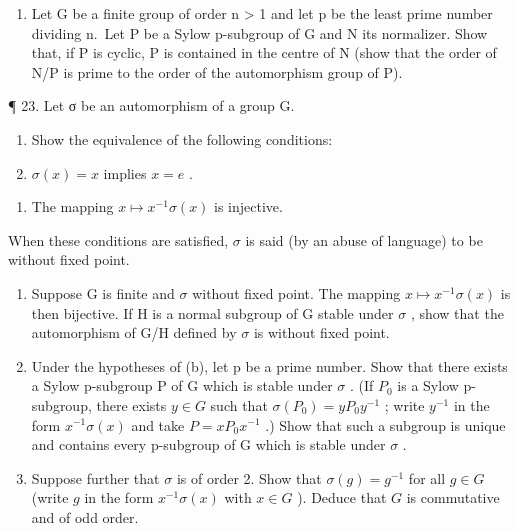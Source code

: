 \begin{enumerate}
\def\labelenumi{\arabic{enumi}.}
\setcounter{enumi}{21}
\tightlist
\item
  Let G be a finite group of order n \textgreater{} 1 and let p be the least prime number dividing n.~Let P be a Sylow p-subgroup of G and N its normalizer. Show that, if P is cyclic, P is contained in the centre of N (show that the order of N/P is prime to the order of the automorphism group of P).
\end{enumerate}

¶ 23. Let σ be an automorphism of a group G.

\begin{enumerate}
\def\labelenumi{(\alph{enumi})}
\item
  Show the equivalence of the following conditions:
\item
  \(\sigma(x) = x\) implies \(x = e\) .
\end{enumerate}

\begin{enumerate}
\def\labelenumi{(\roman{enumi})}
\setcounter{enumi}{1}
\tightlist
\item
  The mapping \(x \mapsto x^{-1}\sigma(x)\) is injective.
\end{enumerate}

When these conditions are satisfied, \(\sigma\) is said (by an abuse of language) to be without fixed point.

\begin{enumerate}
\def\labelenumi{(\alph{enumi})}
\setcounter{enumi}{1}
\item
  Suppose G is finite and \(\sigma\) without fixed point. The mapping \(x \mapsto x^{-1}\sigma(x)\) is then bijective. If H is a normal subgroup of G stable under \(\sigma\) , show that the automorphism of G/H defined by \(\sigma\) is without fixed point.
\item
  Under the hypotheses of (b), let p be a prime number. Show that there exists a Sylow p-subgroup P of G which is stable under \(\sigma\) . (If \(P_{0}\) is a Sylow p-subgroup, there exists \(y \in G\) such that \(\sigma(P_{0}) = yP_{0}y^{-1}\) ; write \(y^{-1}\) in the form \(x^{-1}\sigma(x)\) and take \(P = xP_{0}x^{-1}\) .) Show that such a subgroup is unique and contains every p-subgroup of G which is stable under \(\sigma\) .
\item
  Suppose further that \(\sigma\) is of order 2. Show that \(\sigma(g) = g^{-1}\) for all \(g \in G\) (write \(g\) in the form \(x^{-1}\sigma(x)\) with \(x \in G\) ). Deduce that \(G\) is commutative and of odd order.
\end{enumerate}

